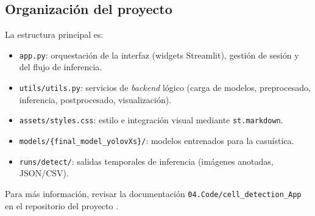 \documentclass[12pt,a4paper,onecolumn,oneside]{report}
\begin{document}
\subsection{Organización del proyecto}
La estructura principal es:
\begin{itemize}
  \item \texttt{app.py}: orquestación de la interfaz (widgets Streamlit), gestión de sesión y del flujo de inferencia.
  \item \texttt{utils/utils.py}: servicios de \textit{backend} lógico (carga de modelos, preprocesado, inferencia, postprocesado, visualización).
  \item \texttt{assets/styles.css}: estilo e integración visual mediante \texttt{st.markdown}.
  \item \texttt{models/\{final\_model\_yolovXs\}/}: modelos entrenados para la casuística.
  \item \texttt{runs/detect/}: salidas temporales de inferencia (imágenes anotadas, JSON/CSV).
\end{itemize}

Para más información, revisar la documentación \texttt{04.Code/cell\_detection\_App} en el repositorio del proyecto \cite{repoTFM}.
\end{document}
